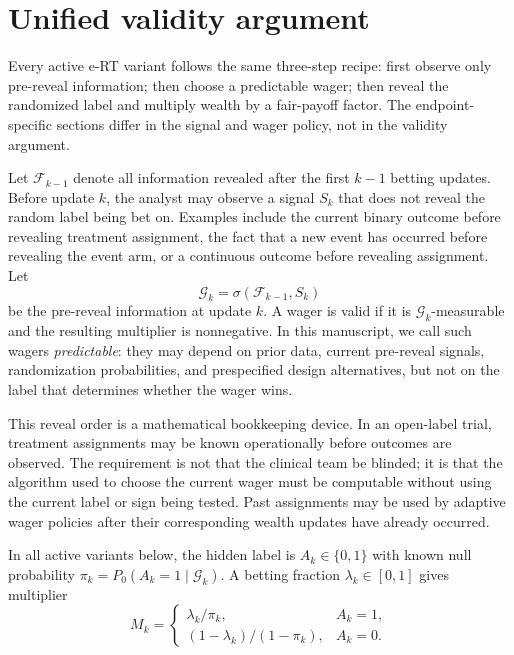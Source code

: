 \documentclass[10pt]{article}
\begin{document}
\section{Unified validity argument}

Every active e-RT variant follows the same three-step recipe: first observe only pre-reveal information; then choose a predictable wager; then reveal the randomized label and multiply wealth by a fair-payoff factor. The endpoint-specific sections differ in the signal and wager policy, not in the validity argument.

Let $\mathcal{F}_{k-1}$ denote all information revealed after the first $k-1$ betting updates. Before update $k$, the analyst may observe a signal $S_k$ that does not reveal the random label being bet on. Examples include the current binary outcome before revealing treatment assignment, the fact that a new event has occurred before revealing the event arm, or a continuous outcome before revealing assignment. Let
\begin{equation}
\mathcal{G}_k = \sigma(\mathcal{F}_{k-1}, S_k)
\end{equation}
be the pre-reveal information at update $k$. A wager is valid if it is $\mathcal{G}_k$-measurable and the resulting multiplier is nonnegative. In this manuscript, we call such wagers \emph{predictable}: they may depend on prior data, current pre-reveal signals, randomization probabilities, and prespecified design alternatives, but not on the label that determines whether the wager wins.

This reveal order is a mathematical bookkeeping device. In an open-label trial, treatment assignments may be known operationally before outcomes are observed. The requirement is not that the clinical team be blinded; it is that the algorithm used to choose the current wager must be computable without using the current label or sign being tested. Past assignments may be used by adaptive wager policies after their corresponding wealth updates have already occurred.

In all active variants below, the hidden label is $A_k \in \{0,1\}$ with known null probability $\pi_k = P_0(A_k=1 \mid \mathcal{G}_k)$. A betting fraction $\lambda_k \in [0,1]$ gives multiplier
\begin{equation}
M_k =
\begin{cases}
\lambda_k / \pi_k, & A_k=1,\\
(1-\lambda_k)/(1-\pi_k), & A_k=0.
\end{cases}
\label{eq:unified_assignment_multiplier}
\end{equation}
\end{document}
